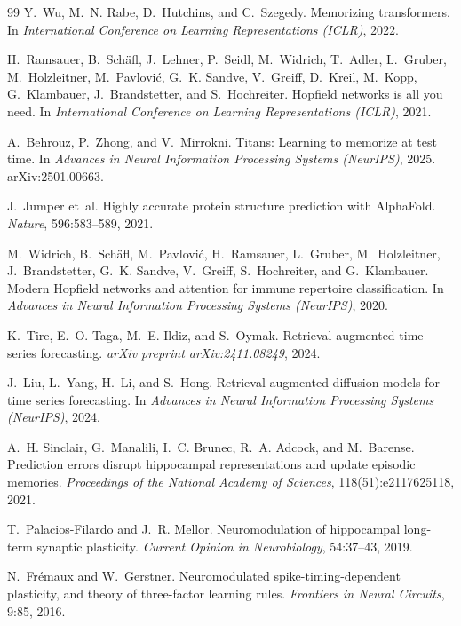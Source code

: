 \documentclass{article}
\begin{document}
\begin{thebibliography}{99}
Y.~Wu, M.~N. Rabe, D.~Hutchins, and C.~Szegedy.
\newblock Memorizing transformers.
\newblock In \emph{International Conference on Learning Representations (ICLR)}, 2022.

H.~Ramsauer, B.~Sch{\"a}fl, J.~Lehner, P.~Seidl, M.~Widrich, T.~Adler, L.~Gruber, M.~Holzleitner, M.~Pavlovi{\'c}, G.~K. Sandve, V.~Greiff, D.~Kreil, M.~Kopp, G.~Klambauer, J.~Brandstetter, and S.~Hochreiter.
\newblock Hopfield networks is all you need.
\newblock In \emph{International Conference on Learning Representations (ICLR)}, 2021.

A.~Behrouz, P.~Zhong, and V.~Mirrokni.
\newblock Titans: Learning to memorize at test time.
\newblock In \emph{Advances in Neural Information Processing Systems (NeurIPS)}, 2025. arXiv:2501.00663.

J.~Jumper et~al.
\newblock Highly accurate protein structure prediction with {AlphaFold}.
\newblock \emph{Nature}, 596:583--589, 2021.

M.~Widrich, B.~Sch{\"a}fl, M.~Pavlovi{\'c}, H.~Ramsauer, L.~Gruber, M.~Holzleitner, J.~Brandstetter, G.~K. Sandve, V.~Greiff, S.~Hochreiter, and G.~Klambauer.
\newblock Modern {Hopfield} networks and attention for immune repertoire classification.
\newblock In \emph{Advances in Neural Information Processing Systems (NeurIPS)}, 2020.

K.~Tire, E.~O. Taga, M.~E. Ildiz, and S.~Oymak.
\newblock Retrieval augmented time series forecasting.
\newblock \emph{arXiv preprint arXiv:2411.08249}, 2024.

J.~Liu, L.~Yang, H.~Li, and S.~Hong.
\newblock Retrieval-augmented diffusion models for time series forecasting.
\newblock In \emph{Advances in Neural Information Processing Systems (NeurIPS)}, 2024.

A.~H. Sinclair, G.~Manalili, I.~C. Brunec, R.~A. Adcock, and M.~Barense.
\newblock Prediction errors disrupt hippocampal representations and update episodic memories.
\newblock \emph{Proceedings of the National Academy of Sciences}, 118(51):e2117625118, 2021.

T.~Palacios-Filardo and J.~R. Mellor.
\newblock Neuromodulation of hippocampal long-term synaptic plasticity.
\newblock \emph{Current Opinion in Neurobiology}, 54:37--43, 2019.

N.~Fr{\'e}maux and W.~Gerstner.
\newblock Neuromodulated spike-timing-dependent plasticity, and theory of three-factor learning rules.
\newblock \emph{Frontiers in Neural Circuits}, 9:85, 2016.


\end{thebibliography}
\end{document}
